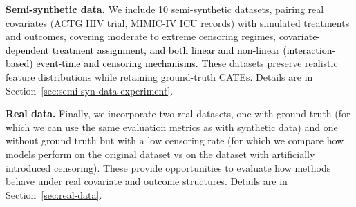 \documentclass{article} %
\newcommand{\rebuttal}[1]{\textcolor{black}{#1}}
\begin{document}
\vspace{-3pt}
\textbf{Semi-synthetic data.}
We include 10 semi-synthetic datasets, pairing real covariates (ACTG HIV trial, MIMIC-IV ICU records) with simulated treatments and outcomes, covering moderate to extreme censoring regimes, \rebuttal{covariate-dependent treatment assignment, and both linear and non-linear (interaction-based) event-time and censoring mechanisms.}
These datasets preserve realistic feature distributions while retaining ground-truth CATEs. 
Details are in Section~\ref{sec:semi-syn-data-experiment}.



\vspace{-3pt}
\textbf{Real data.} Finally, we incorporate two real datasets, one with ground truth (for which we can use the same evaluation metrics as with synthetic data) and one without ground truth but with a low censoring rate (for which we compare how models perform on the original dataset vs on the dataset with artificially introduced censoring). These provide opportunities to evaluate how methods behave under real covariate and outcome structures. Details are in Section~\ref{sec:real-data}.
\end{document}
